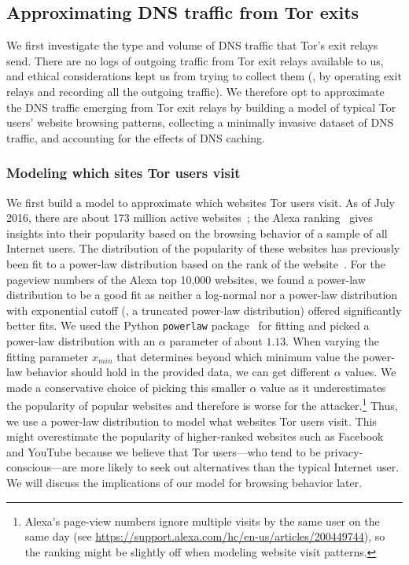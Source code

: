 \subsection{Approximating DNS traffic from Tor exits}
\label{sec:attack:sim}

We first investigate the type and volume of DNS traffic that Tor's exit relays
send.  There are no logs of outgoing traffic
from Tor exit relays available to us, and ethical considerations kept us
from trying to collect them (\eg, by operating exit relays and recording
all the outgoing traffic). We therefore opt to approximate the DNS traffic
emerging from Tor exit relays by \first building a model of typical Tor
users' website browsing patterns, \second collecting a minimally invasive
dataset of DNS traffic, and \third accounting for the effects of DNS caching.

\subsubsection{Modeling which sites Tor users visit}
\label{sec:attack:pop}

We first build a model to approximate {which websites} Tor users visit.
As of July 2016, there are about 173 million active
websites~\cite{numberofwebsites}; the Alexa ranking~\cite{alexatop1k}
gives insights into their popularity based on the browsing behavior of
a sample of all Internet users. The distribution of the popularity of
these websites has previously been fit to a power-law distribution based
on the rank of the
website~\cite{Mahanti2013a,Clauset2009a,Ali2007a}.
For the pageview numbers of the Alexa top 10,000 websites, we found a
power-law distribution to be a good fit as neither a log-normal nor a
power-law distribution with exponential cutoff (\ie, a truncated power-law
distribution) offered significantly better fits.
We used the Python {\tt powerlaw} package~\cite{Alstott2014a} for fitting and
picked a power-law distribution with an $\alpha$ parameter of about $1.13$.
When varying the fitting parameter $x_{min}$ that determines beyond which
minimum value the power-law behavior should hold in the provided data, we can
get different $\alpha$ values. We made a conservative choice of picking this
smaller $\alpha$ value as it underestimates the popularity of popular websites
and therefore is worse for the attacker.\footnote{Alexa's page-view numbers
ignore multiple visits by the same user on the same day (see
\url{https://support.alexa.com/hc/en-us/articles/200449744}), so the ranking
might be slightly off when modeling website visit patterns.}
Thus, we use a power-law distribution to model what websites Tor users visit.
This might overestimate the popularity of higher-ranked websites such as
Facebook and YouTube because we believe that Tor users---who tend to be
privacy-conscious---are more likely to seek out alternatives than the typical
Internet user.  We will discuss the implications of our model for browsing
behavior later.

